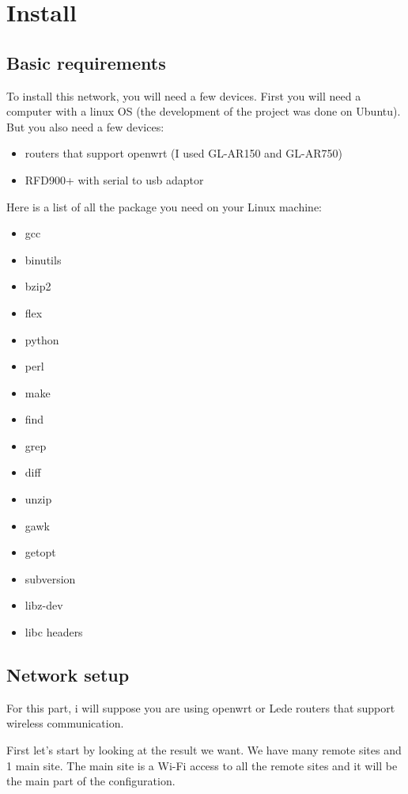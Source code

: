 \chapter{Install}


\section{Basic requirements}


To install this network, you will need a few devices.
First you will need a computer with a linux OS (the development of the project was done on Ubuntu). But you also need a few devices:
\begin{itemize}
	\item routers that support openwrt (I used GL-AR150 and GL-AR750)
	\item RFD900+ with serial to usb adaptor
\end{itemize}

Here is a list of all the package you need on your Linux machine:
\begin{itemize}
	\item gcc 
	\item binutils
	\item bzip2
	\item flex
	\item python
	\item perl
	\item make
	\item find
	\item grep
	\item diff
	\item unzip
	\item gawk
	\item getopt
	\item subversion
	\item libz-dev
	\item libc headers
\end{itemize}



\section{Network setup}


For this part, i will suppose you are using openwrt or Lede routers that support wireless communication.

First let's start by looking at the result we want. 
We have many remote sites and 1 main site. The main site is a Wi-Fi access to all the remote sites and it will be the main part of the configuration.

